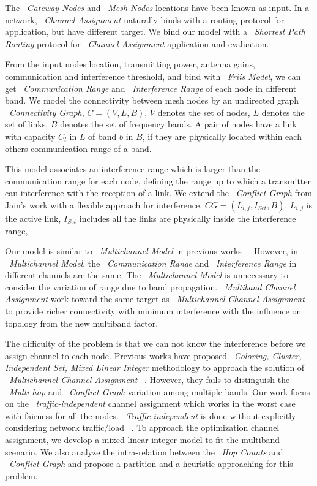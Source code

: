 The ~\emph{Gateway Nodes} and ~\emph{Mesh Nodes} locations have been known as input. In a network, ~\emph{Channel Assignment} naturally binds with a routing protocol for application, but have different target. We bind our model with a ~\emph{Shortest Path Routing} protocol for ~\emph{Channel Assignment} application and evaluation.

From the input nodes location, transmitting power, antenna gains, communication and interference threshold, and bind with ~\emph{Friis Model}, we can get ~\emph{Communication Range} and ~\emph{Interference Range} of each node in different band. 
We model the connectivity between mesh nodes by an undirected graph ~\emph{Connectivity Graph}, $C=(V,L,B)$, $V$ denotes the set of nodes, $L$ denotes the set of links, $B$ denotes the set of frequency bands. A pair of nodes have a link with capacity $C_l$ in $L$ of band $b$ in $B$, if they are physically located within each others communication range of a band. 

This model associates an interference range which is larger than the communication range for each node, defining the range up to which a transmitter can interference with the reception of a link. We extend the ~\emph{Conflict Graph} from Jain's work with a flexible approach for interference, $CG=(L_{i,j},I_{Set},B)$. $L_{i,j}$ is the active link, $I_{Set}$ includes all the links are physically inside the interference range, 

Our model is similar to ~\emph{Multichannel Model} in previous works ~\cite{tang2005interference,yuan2006cross,si2010overview}. However, in ~\emph{Multichannel Model}, the ~\emph{Communication Range} and ~\emph{Interference Range} in different channels are the same. The ~\emph{Multichannel Model} is unnecessary to consider the variation of range due to band propagation.
~\emph{Multiband Channel Assignment} work toward the same target as ~\emph{Multichannel Channel Assignment} to provide richer connectivity with minimum interference with the influence on topology from the new multiband factor.

The difficulty of the problem is that we can not know the interference before we assign channel to each node. Previous works have proposed ~\emph{Coloring, Cluster, Independent Set, Mixed Linear Integer} methodology to approach the solution of ~\emph{Multichannel Channel Assignment} ~\cite{mishra2005weighted,peng2012efficient,tang2005interference}. 
However, they fails to distinguish the ~\emph{Multi-hop} and ~\emph{Conflict Graph} variation among multiple bands.
Our work focus on the ~\emph{traffic-independent} channel assignment which works in the worst case with fairness for all the nodes.
~\emph{Traffic-independent} is done without explicitly considering network traffic/load ~\cite{marina2010topology}.
To approach the optimization channel assignment, we develop a mixed linear integer model to fit the multiband scenario. We also analyze the intra-relation between the ~\emph{Hop Counts} and ~\emph{Conflict Graph} and propose a partition and a heuristic approaching for this problem.

